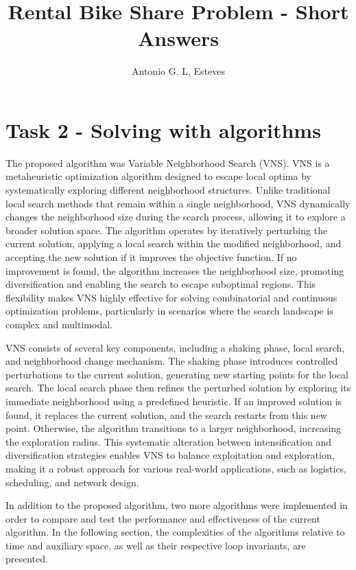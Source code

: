 \documentclass{article}
\begin{document}
	\title{Rental Bike Share Problem - Short Answers}
	\author{Antonio G. L, Esteves}
	\maketitle
	

	\section{Task 2 - Solving with algorithms}
	
	The proposed algorithm was Variable Neighborhood Search (VNS). VNS is a metaheuristic optimization algorithm designed to escape local optima by systematically exploring different neighborhood structures. Unlike traditional local search methods that remain within a single neighborhood, VNS dynamically changes the neighborhood size during the search process, allowing it to explore a broader solution space. The algorithm operates by iteratively perturbing the current solution, applying a local search within the modified neighborhood, and accepting the new solution if it improves the objective function. If no improvement is found, the algorithm increases the neighborhood size, promoting diversification and enabling the search to escape suboptimal regions. This flexibility makes VNS highly effective for solving combinatorial and continuous optimization problems, particularly in scenarios where the search landscape is complex and multimodal.
	
	VNS consists of several key components, including a shaking phase, local search, and neighborhood change mechanism. The shaking phase introduces controlled perturbations to the current solution, generating new starting points for the local search. The local search phase then refines the perturbed solution by exploring its immediate neighborhood using a predefined heuristic. If an improved solution is found, it replaces the current solution, and the search restarts from this new point. Otherwise, the algorithm transitions to a larger neighborhood, increasing the exploration radius. This systematic alteration between intensification and diversification strategies enables VNS to balance exploitation and exploration, making it a robust approach for various real-world applications, such as logistics, scheduling, and network design.
	
	In addition to the proposed algorithm, two more algorithms were implemented in order to compare and test the performance and effectiveness of the current algorithm. In the following section, the complexities of the algorithms relative to time and auxiliary space, as well as their respective loop invariants, are presented.
	
\end{document}
